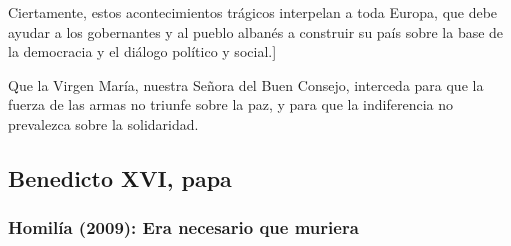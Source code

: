 \begin{body}
{Ciertamente, estos acontecimientos trágicos interpelan a toda Europa, que debe ayudar a los gobernantes y al pueblo albanés a construir su país sobre la base de la democracia y el diálogo político y social.]}

Que la Virgen María, nuestra Señora del Buen Consejo, interceda para que la fuerza de las armas no triunfe sobre la paz, y para que la indiferencia no prevalezca sobre la solidaridad.
\end{body}


\newsection
\subsection{Benedicto XVI, papa}

\subsubsection{Homilía (2009): Era necesario que muriera}


